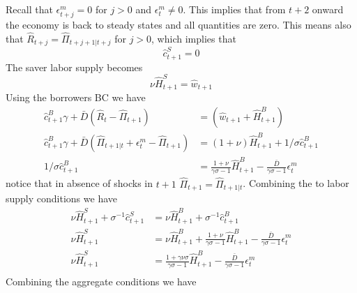 \documentclass[a4paper,12pt]{article}%
\begin{document}
Recall that $\epsilon^m_{t+j} = 0$ for $j>0$ and $\epsilon^m_{t}\neq 0$.  This implies that from $t+2$ onward the economy is back to steady states and all quantities are zero. This means also that $ \hat{R}_{t+j} = \hat{\Pi}_{t+j+1|t+j}$ for $j>0$, which implies that 
$$ \hat{c}_{t+1}^{S} =0$$
The saver labor supply becomes
$$ \nu \hat{H}^S_{t+1} =\hat{w}_{t+1}$$
Using the borrowers BC we have 
\begin{align*}
\hat{c}^B_{t+1} \gamma+{\bar{D}}(\hat{R}_{t}-\hat{\Pi}_{t+1}) &= \left({\hat{w}}_{t+1}+\hat{H}^B_{t+1}\right)\\
\hat{c}^B_{t+1} \gamma+{\bar{D}}(\hat{\Pi}_{t+1|t}+\epsilon^m_{t}-\hat{\Pi}_{t+1}) &= (1+\nu)\hat{H}^B_{t+1} + 1/\sigma\hat{c}^B_{t+1} \\
1/ \sigma \hat{c}^B_{t+1}&= \frac{1+\nu}{\gamma\sigma-1} \hat{H}^B_{t+1} - \frac{\bar{D}}{\gamma\sigma-1} \epsilon^m_{t}
\end{align*}
notice that in absence of shocks in $t+1$ $\hat{\Pi}_{t+1} =\hat{\Pi}_{t+1|t}$. Combining the to labor supply conditions we have 
\begin{align*}
\nu \hat{H}^S_{t+1} + \sigma^{-1} \hat{c}^S_{t+1} &= \nu \hat{H}^B_{t+1} + \sigma^{-1} \hat{c}^B_{t+1}\\
\nu \hat{H}^S_{t+1}  &= \nu \hat{H}^B_{t+1} + \frac{1+\nu}{\gamma\sigma-1} \hat{H}^B_{t+1} - \frac{\bar{D}}{\gamma\sigma-1} \epsilon^m_{t}\\
\nu \hat{H}^S_{t+1}  &= \frac{1+\gamma\nu\sigma}{\gamma\sigma-1} \hat{H}^B_{t+1} - \frac{\bar{D}}{\gamma\sigma-1} \epsilon^m_{t}\\
\end{align*}
Combining the aggregate conditions we have
\end{document}
